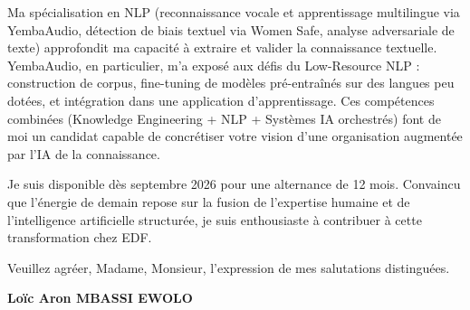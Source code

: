 \documentclass[a4paper,11pt]{article}
\begin{document}
\vspace{0.8em}
Ma spécialisation en NLP (reconnaissance vocale et apprentissage multilingue via YembaAudio, détection de biais textuel via Women Safe, analyse adversariale de texte) approfondit ma capacité à extraire et valider la connaissance textuelle. YembaAudio, en particulier, m'a exposé aux défis du Low-Resource NLP : construction de corpus, fine-tuning de modèles pré-entraînés sur des langues peu dotées, et intégration dans une application d'apprentissage. Ces compétences combinées (Knowledge Engineering + NLP + Systèmes IA orchestrés) font de moi un candidat capable de concrétiser votre vision d'une organisation augmentée par l'IA de la connaissance.

\vspace{0.8em}
Je suis disponible dès septembre 2026 pour une alternance de 12 mois. Convaincu que l'énergie de demain repose sur la fusion de l'expertise humaine et de l'intelligence artificielle structurée, je suis enthousiaste à contribuer à cette transformation chez EDF.

\vspace{1.5em}
\noindent Veuillez agréer, Madame, Monsieur, l'expression de mes salutations distinguées.

\vspace{2em}
\noindent \textbf{Loïc Aron MBASSI EWOLO}
\end{document}
